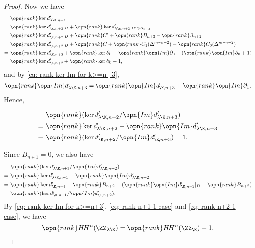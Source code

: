 \begin{proof}
Now we have
\begin{equation*}
    \begin{split}
        & \ \opn{rank} \ker d'_{\lambda\K,n+2}\\
        = & \  \opn{rank} \ker d'_{\K,n+2}|_D
        + \opn{rank} \ker d'_{\lambda\K,n+2}|_{C'\oplus B_{n+3}}\\
        = & \  \opn{rank} \ker d'_{\K,n+2}|_D
        + \opn{rank} C' + \opn{rank} B_{n+3} - \opn{rank} B_{n+2}\\
        = & \  \opn{rank} \ker d'_{\K,n+2}|_D
        + \opn{rank} C + \opn{rank} C_1(\Delta^{m-n-2})
        -\opn{rank} C_0(\Delta^{m-n-2})\\
        = & \  \opn{rank} \ker d'_{\K,n+2}+
        \opn{rank} \ker \partial_0 +\opn{rank} \opn{Im} \partial_0
        -(\opn{rank} \opn{Im} \partial_0+1)\\
        = & \ \opn{rank} \ker d'_{\K,n+2}+
        \opn{rank} \ker \partial_0-1,
    \end{split}
\end{equation*}
and by \eqref{eq: rank ker Im for k>=n+3},
$$\opn{rank} \opn{Im} d'_{\lambda\K,n+3}
= \opn{rank} \opn{Im} d'_{\K,n+3} + \opn{rank} \opn{Im} \partial_1.$$
Hence,

\begin{equation}
\label{eq: rank n+2 1 case}
    \begin{split}
         & \ \opn{rank} (\ker d'_{\lambda\K,n+2}/\opn{Im} d'_{\lambda\K,n+3})\\
        = & \ \opn{rank} \ker d'_{\lambda\K,n+2}-
        \opn{rank} \opn{Im} d'_{\lambda\K,n+3}\\
        = & \ \opn{rank} (\ker d'_{\K,n+2}/\opn{Im} d'_{\K,n+3})-1.
    \end{split}
\end{equation}

Since $B_{n+1}=0$, we also have
\begin{equation}
\label{eq: rank n+1 1 case}
    \begin{split}
         & \ \opn{rank} (\ker d'_{\lambda\K,n+1}/\opn{Im} d'_{\lambda\K,n+2})\\
        = & \ \opn{rank} \ker d'_{\lambda\K,n+1}-
        \opn{rank} \opn{Im} d'_{\lambda\K,n+2}\\
        = & \ \opn{rank} \ker d'_{\K,n+1}+\opn{rank} B_{n+2}-
        (\opn{rank} \opn{Im} d'_{\K,n+2}|_D+
        \opn{rank} B_{n+2})\\
        = & \ \opn{rank} (\ker d'_{\K,n+1}/\opn{Im} d'_{\K,n+2}).
    \end{split}
\end{equation}
By \eqref{eq: rank ker Im for k>=n+3}, \eqref{eq: rank n+1 1 case}
and \eqref{eq: rank n+2 1 case}, we have
$$\opn{rank} H\!H^n(\ZZ_{\lambda\K})=\opn{rank} H\!H^n
(\ZZ_{\K})-1.$$


\end{proof}
